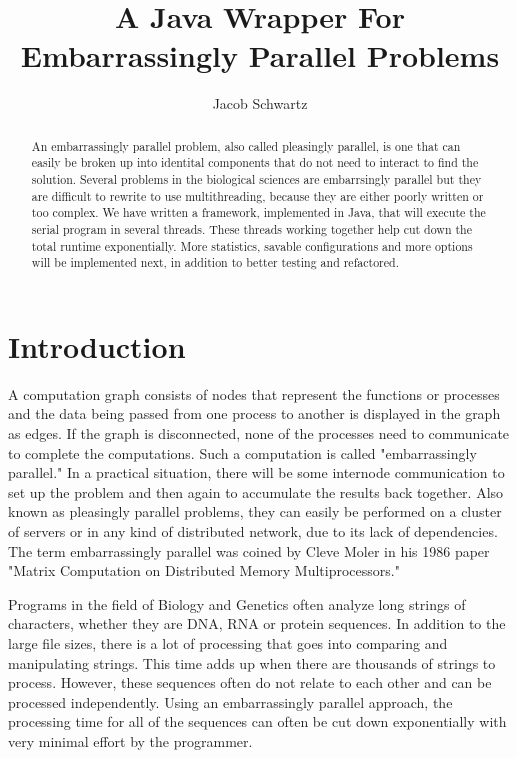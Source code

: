 \documentclass[12pt]{article}
\begin{document}
\title{A Java Wrapper For Embarrassingly Parallel Problems}
\author{Jacob Schwartz}
\maketitle

\begin{abstract}
An embarrassingly parallel problem, also called pleasingly parallel, is one that 
can easily be broken up into identital components that do not need to interact 
to find the solution. Several problems in the biological sciences are 
embarrsingly parallel but they are difficult to rewrite to use multithreading, 
because they are either poorly written or too complex. We have written a 
framework, implemented in Java, that will execute the serial program in several 
threads. These threads working together help cut down the total runtime
exponentially. More statistics, savable configurations and more options will be 
implemented next, in addition to better testing and refactored.
\end{abstract}

\section{Introduction}

A computation graph consists of nodes that represent the functions or processes 
and the data being passed from one process to another is displayed in the graph 
as edges. If the graph is disconnected, none of the processes need to 
communicate to complete the computations. Such a computation is called
"embarrassingly parallel." In a practical situation, there will be some 
internode communication to set up the problem and then again to accumulate the 
results back together. Also known as pleasingly parallel problems, they can 
easily be performed on a cluster of servers or in any kind of distributed 
network, due to its lack of dependencies. The term embarrassingly parallel was 
coined by Cleve Moler in his 1986 paper "Matrix Computation on Distributed
Memory Multiprocessors." \cite{history}

Programs in the field of Biology and Genetics often analyze long strings of
characters, whether they are DNA, RNA or protein sequences. In addition to the
large file sizes, there is a lot of processing that goes into comparing and
manipulating strings. This time adds up when there are thousands of strings to 
process. However, these sequences often do not relate to each other and can be 
processed independently. Using an embarrassingly parallel approach, the 
processing time for all of the sequences can often be cut down exponentially 
with very minimal effort by the programmer.
\end{document}
